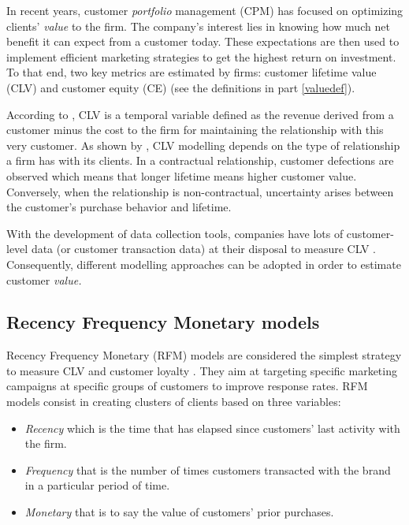 \documentclass[
]{book}
\providecommand{\tightlist}{%
  \setlength{\itemsep}{0pt}\setlength{\parskip}{0pt}}
\begin{document}
In recent years, customer \emph{portfolio} management (CPM) has focused on optimizing clients' \emph{value} to the firm. The company's interest lies in knowing how much net benefit it can expect from a customer today. These expectations are then used to implement efficient marketing strategies to get the highest return on investment. To that end, two key metrics are estimated by firms: customer lifetime value (CLV) and customer equity (CE) (see the definitions in part \ref{valuedef}).

According to \citet{CLV_DEF}, CLV is a temporal variable defined as the revenue derived from a customer minus the cost to the firm for maintaining the relationship with this very customer. As shown by \citet{CLV_CONTEXT}, CLV modelling depends on the type of relationship a firm has with its clients. In a contractual relationship, customer defections are observed which means that longer lifetime means higher customer value. Conversely, when the relationship is non-contractual, uncertainty arises between the customer's purchase behavior and lifetime.

With the development of data collection tools, companies have lots of customer-level data (or customer transaction data) at their disposal to measure CLV \citep{CLV_NBD}. Consequently, different modelling approaches can be adopted in order to estimate customer \emph{value.}

\hypertarget{recency-frequency-monetary-models}{%
\subsection{Recency Frequency Monetary models}\label{recency-frequency-monetary-models}}

Recency Frequency Monetary (RFM) models are considered the simplest strategy to measure CLV and customer loyalty \citep{CLV}. They aim at targeting specific marketing campaigns at specific groups of customers to improve response rates. RFM models consist in creating clusters of clients based on three variables:

\begin{itemize}
\tightlist
\item
  \emph{Recency} which is the time that has elapsed since customers' last activity with the firm.
\item
  \emph{Frequency} that is the number of times customers transacted with the brand in a particular period of time.
\item
  \emph{Monetary} that is to say the value of customers' prior purchases.
\end{itemize}
\end{document}
